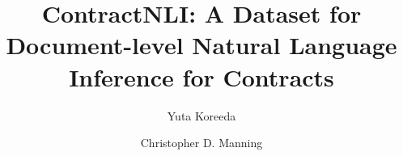 \usepackage{autonum} %

\usepackage{fancyvrb}
\newenvironment{CVerbatim}
{\center\csname BVerbatim*\endcsname}
{\csname endBVerbatim*\endcsname\endcenter}



%
%

\title{ContractNLI: A Dataset for Document-level Natural Language Inference for Contracts}



\setlength{\affilsep}{0em}   %
\author[12]{Yuta Koreeda}
\author[2]{Christopher D. Manning}
\date{}


